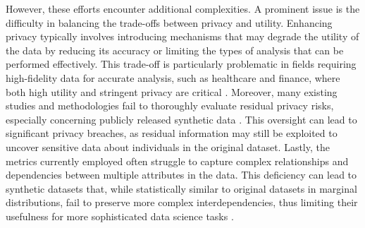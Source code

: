 \documentclass{article}
\begin{document}
However, these efforts encounter additional complexities. A prominent issue is the difficulty in balancing the trade-offs between privacy and utility. Enhancing privacy typically involves introducing mechanisms that may degrade the utility of the data by reducing its accuracy or limiting the types of analysis that can be performed effectively. This trade-off is particularly problematic in fields requiring high-fidelity data for accurate analysis, such as healthcare and finance, where both high utility and stringent privacy are critical \parencite{mendelevitch_fidelity_2021,caliskan_comparative_2023}. Moreover, many existing studies and methodologies fail to thoroughly evaluate residual privacy risks, especially concerning publicly released synthetic data \parencite{kaabachi_scoping_2024}. This oversight can lead to significant privacy breaches, as residual information may still be exploited to uncover sensitive data about individuals in the original dataset. Lastly, the metrics currently employed often struggle to capture complex relationships and dependencies between multiple attributes in the data. This deficiency can lead to synthetic datasets that, while statistically similar to original datasets in marginal distributions, fail to preserve more complex interdependencies, thus limiting their usefulness for more sophisticated data science tasks \parencite{jordon_synthetic_2022}.
\end{document}
